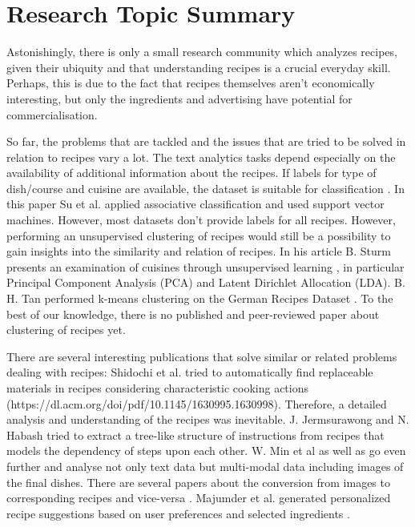 \documentclass[
     12pt,         %
     a4paper,      %
     BCOR10mm,     %
     DIV14,        %
     ]{article}
\begin{document}

\section{Research Topic Summary}

Astonishingly, there is only a small research community which analyzes recipes, given their ubiquity and that understanding recipes is a crucial everyday skill. Perhaps, this is due to the fact that recipes themselves aren't economically interesting, but only the ingredients and advertising have potential for commercialisation.

So far, the problems that are tackled and the issues that are tried to be solved in relation to recipes vary a lot. The text analytics tasks depend especially on the availability of additional information about the recipes. If labels for type of dish/course and cuisine are available, the dataset is suitable for classification \cite{recipeclassification, cultdiffusion}. In this paper Su et al. applied associative classification and used support vector machines. However, most datasets don't provide labels for all recipes. However, performing an unsupervised clustering of recipes would still be a possibility to gain insights into the similarity and relation of recipes. In his article B. Sturm presents an examination of cuisines through unsupervised learning \cite{unsupervisedclustering}, in particular Principal Component Analysis (PCA) and Latent Dirichlet Allocation (LDA). B. H. Tan performed k-means clustering \cite{clusteringrecipes} on the German Recipes Dataset \cite{germanrecipesdataset}. To the best of our knowledge, there is no published and peer-reviewed paper about clustering of recipes yet.

There are several interesting publications that solve similar or related problems dealing with recipes: Shidochi et al. tried to automatically find replaceable materials in recipes considering characteristic cooking actions (https://dl.acm.org/doi/pdf/10.1145/1630995.1630998). Therefore, a detailed analysis and understanding of the recipes was inevitable. J. Jermsurawong and N. Habash tried to extract a tree-like structure of instructions from recipes that models the dependency of steps upon each other. W. Min et al \cite{multimodal} as well as \cite{marin2019recipe1m} go even further and analyse not only text data but multi-modal data including images of the final dishes. There are several papers about the conversion from images to corresponding recipes and vice-versa \cite{marin2019recipe1m, 8099810}. Majumder et al. generated personalized recipe suggestions based on user preferences and selected ingredients \cite{majumder-etal-2019-generating}.
\end{document}
